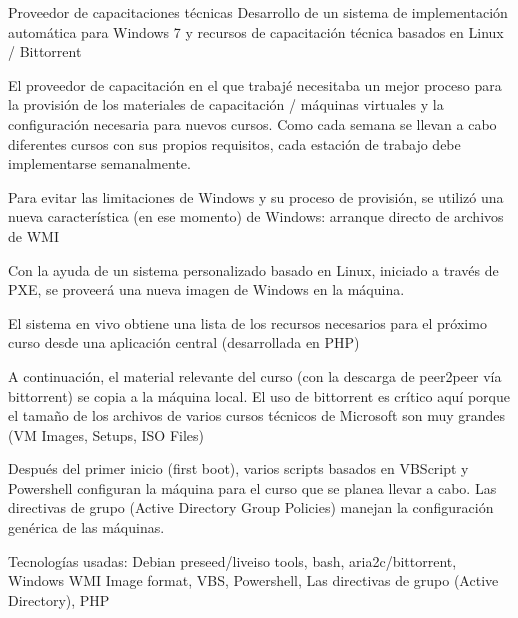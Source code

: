 \begin{cventries}
  \cventry
    {Proveedor de capacitaciones técnicas}
    {Desarrollo de un sistema de implementación automática para Windows 7 y recursos de capacitación técnica basados en Linux / Bittorrent}
    {}
    {}
    {
      \begin{cvitems}
      \item El proveedor de capacitación en el que trabajé necesitaba un mejor proceso para la provisión de
        los materiales de capacitación / máquinas virtuales y la configuración necesaria para nuevos
        cursos. Como cada semana se llevan a cabo diferentes cursos con sus propios requisitos, cada
        estación de trabajo debe implementarse semanalmente.
      \item  Para evitar las limitaciones de Windows y su proceso de provisión, se utilizó una nueva
        característica (en ese momento) de Windows: arranque directo de archivos de WMI
      \item Con la ayuda de un sistema personalizado basado en Linux, iniciado a través de PXE, se proveerá una nueva imagen de Windows en la máquina.
      \item El sistema en vivo obtiene una lista de los recursos necesarios para el próximo curso desde una aplicación central (desarrollada en PHP)
      \item A continuación, el material relevante del curso (con la descarga de peer2peer vía bittorrent) se
        copia a la máquina local. El uso de bittorrent es crítico aquí porque el tamaño de los archivos de
        varios cursos técnicos de Microsoft son muy grandes (VM Images, Setups, ISO Files)
      \item Después del primer inicio (first boot), varios scripts basados en VBScript y Powershell configuran
        la máquina para el curso que se planea llevar a cabo. Las directivas de grupo (Active Directory
        Group Policies) manejan la configuración genérica de las máquinas.
      \item Tecnologías usadas: Debian preseed/liveiso tools, bash, aria2c/bittorrent, Windows WMI Image
        format, VBS, Powershell, Las directivas de grupo (Active Directory), PHP
      \end{cvitems}
    }
\end{cventries}
\clearpage

